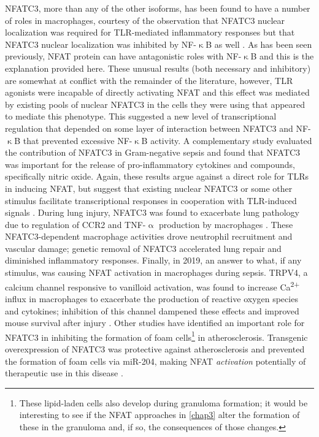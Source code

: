 NFATC3, more than any of the other isoforms, has been found to have a number of roles in macrophages, courtesy of the observation that NFATC3 nuclear localization was required for TLR\hyp{}mediated inflammatory responses \citep{Minematsu2011} but that NFATC3 nuclear localization was inhibited by NF\hyp{}$\upkappa$B as well \citep{Conboy1999}. As has been seen previously, NFAT protein can have antagonistic roles with NF\hyp{}$\upkappa$B and this is the explanation provided here. These unusual results (both necessary and inhibitory) are somewhat at conflict with the remainder of the literature, however, TLR agonists were incapable of directly activating NFAT and this effect was mediated by existing pools of nuclear NFATC3 in the cells they were using that appeared to mediate this phenotype. This suggested a new level of transcriptional regulation that depended on some layer of interaction between NFATC3 and NF\hyp{}$\upkappa$B that prevented excessive NF\hyp{}$\upkappa$B activity. A complementary study evaluated the contribution of NFATC3 in Gram\hyp{}negative sepsis and found that NFATC3 was important for the release of pro\hyp{}inflammatory cytokines and compounds, specifically nitric oxide. Again, these results argue against a direct role for TLRs in inducing NFAT, but suggest that existing nuclear NFATC3 or some other stimulus facilitate transcriptional responses in cooperation with TLR\hyp{}induced signals \citep{Ranjan2014}. During lung injury, NFATC3 was found to exacerbate lung pathology due to regulation of CCR2 and TNF\hyp{}$\upalpha$ production by macrophages \citep{Karpurapu2018}. These NFATC3\hyp{}dependent macrophage activities drove neutrophil recruitment and vascular damage; genetic removal of NFATC3 accelerated lung repair and diminished inflammatory responses. Finally, in 2019, an answer to what, if any stimulus, was causing NFAT activation in macrophages during sepsis. TRPV4, a calcium channel responsive to vanilloid activation, was found to increase Ca\textsuperscript{2+} influx in macrophages to exacerbate the production of reactive oxygen species and cytokines; inhibition of this channel dampened these effects and improved mouse survival after injury \citep{Li2019}. Other studies have identified an important role for NFATC3 in inhibiting the formation of foam cells\footnote{These lipid\hyp{}laden cells also develop during granuloma formation; it would be interesting to see if the NFAT approaches in \autoref{chap3} alter the formation of these in the granuloma and, if so, the consequences of those changes.} in atherosclerosis. Transgenic overexpression of NFATC3 was protective against atherosclerosis and prevented the formation of foam cells via miR\hyp{}204, making NFAT \textit{activation} potentially of therapeutic use in this disease \citep{Liu2021a}. 

